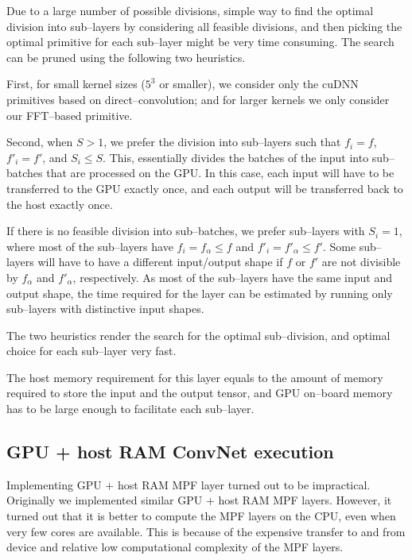 \documentclass[conference]{./IEEEtran}
\begin{document}
  Due to a large number of possible divisions, simple way to find the
  optimal division into sub--layers by considering all feasible
  divisions, and then picking the optimal primitive for each
  sub--layer might be very time consuming.  The search can be pruned
  using the following two heuristics.

  First, for small kernel sizes ($5^3$ or smaller), we consider only
  the cuDNN primitives based on direct--convolution; and for larger
  kernels we only consider our FFT--based primitive.

  Second, when $S > 1$, we prefer the division into sub--layers such
  that $f_i=f$, $f'_i=f'$, and $S_i \le S$.  This, essentially divides
  the batches of the input into sub--batches that are processed on the
  GPU.  In this case, each input will have to be transferred to the
  GPU exactly once, and each output will be transferred back to the
  host exactly once.

  If there is no feasible division into sub--batches, we prefer
  sub--layers with $S_i = 1$, where most of the sub--layers have $f_i
  = f_{\alpha} \le f$ and $f'_i = f'_{\alpha} \le f'$.  Some
  sub--layers will have to have a different input/output shape if $f$
  or $f'$ are not divisible by $f_{\alpha}$ and $f'_{\alpha}$,
  respectively.  As most of the sub--layers have the same input and
  output shape, the time required for the layer can be estimated by
  running only sub--layers with distinctive input shapes.

  The two heuristics render the search for the optimal sub--division,
  and optimal choice for each sub--layer very fast.

  The host memory requirement for this layer equals to the amount of
  memory required to store the input and the output tensor, and GPU
  on--board memory has to be large enough to facilitate each
  sub--layer.

\subsection{GPU + host RAM ConvNet execution}

  Implementing GPU + host RAM MPF layer turned out to be impractical.
  Originally we implemented similar GPU + host RAM MPF layers.
  However, it turned out that it is better to compute the MPF layers
  on the CPU, even when very few cores are available.  This is because
  of the expensive transfer to and from device and relative low
  computational complexity of the MPF layers.
\end{document}
